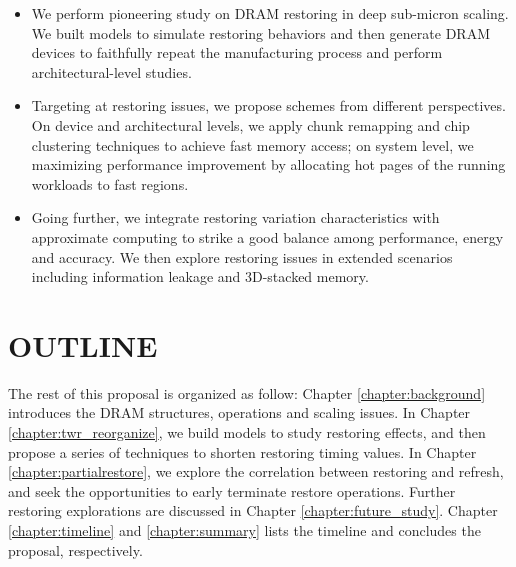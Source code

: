 \begin{itemize}
\item We perform pioneering study on DRAM restoring in deep sub-micron scaling. We built models to simulate restoring behaviors and then generate DRAM devices to faithfully repeat the manufacturing process  and perform architectural-level studies.
\item Targeting at restoring issues, we propose schemes from different perspectives. On device and architectural levels, we apply chunk remapping and chip clustering techniques to achieve fast memory access; on system level, we maximizing performance improvement by allocating hot pages of the running workloads to fast regions.
\item Going further, we integrate restoring variation characteristics with approximate computing to strike a good balance among performance, energy and accuracy. We then explore restoring issues in extended scenarios including information leakage and 3D-stacked memory.  
\end{itemize}



\section{OUTLINE}
\label{outline}
The rest of this proposal is organized as follow:  
Chapter \ref{chapter:background} introduces the DRAM structures, operations and scaling issues.
In Chapter \ref{chapter:twr_reorganize}, we build models to study restoring effects, and then propose a series of techniques to shorten restoring timing values.
In Chapter \ref{chapter:partialrestore}, we explore the correlation between restoring and refresh, and seek the opportunities to early terminate restore operations.
Further restoring explorations are discussed in Chapter \ref{chapter:future_study}.
Chapter \ref{chapter:timeline} and \ref{chapter:summary} lists the timeline and concludes the proposal, respectively.








